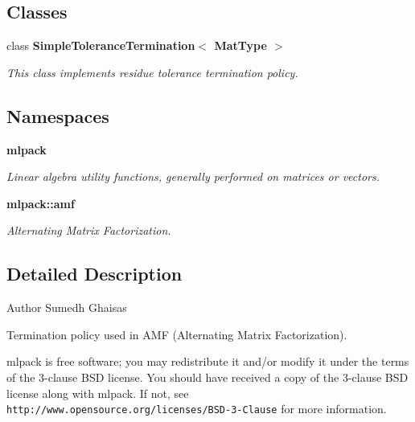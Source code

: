\subsection*{Classes}
\begin{DoxyCompactItemize}
\item 
class \textbf{ Simple\+Tolerance\+Termination$<$ Mat\+Type $>$}
\begin{DoxyCompactList}\small\item\em This class implements residue tolerance termination policy. \end{DoxyCompactList}\end{DoxyCompactItemize}
\subsection*{Namespaces}
\begin{DoxyCompactItemize}
\item 
 \textbf{ mlpack}
\begin{DoxyCompactList}\small\item\em Linear algebra utility functions, generally performed on matrices or vectors. \end{DoxyCompactList}\item 
 \textbf{ mlpack\+::amf}
\begin{DoxyCompactList}\small\item\em Alternating Matrix Factorization. \end{DoxyCompactList}\end{DoxyCompactItemize}


\subsection{Detailed Description}
\begin{DoxyAuthor}{Author}
Sumedh Ghaisas
\end{DoxyAuthor}
Termination policy used in A\+MF (Alternating Matrix Factorization).

mlpack is free software; you may redistribute it and/or modify it under the terms of the 3-\/clause B\+SD license. You should have received a copy of the 3-\/clause B\+SD license along with mlpack. If not, see {\tt http\+://www.\+opensource.\+org/licenses/\+B\+S\+D-\/3-\/\+Clause} for more information. 